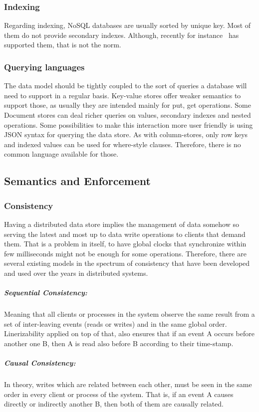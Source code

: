 	\subsubsection{Indexing}
	Regarding indexing, NoSQL databases are usually sorted by unique key. Most of them do not provide secondary indexes. Although, recently for instance~\cite{Mongodb} has supported them, that is not the norm. 
	
	\subsubsection{Querying languages}
	The data model should be tightly coupled to the sort of queries a database will need to support in a regular basis. Key-value stores offer weaker semantics to support those, as usually they are intended mainly for put, get operations. Some Document stores can deal richer queries on values, secondary indexes and nested operations. Some possibilities to make this interaction more user friendly is using JSON syntax for querying the data store. As with column-stores, only row keys and indexed values can be used for where-style clauses. Therefore, there is no common language available for those.

\subsection{Semantics and Enforcement}

	\subsubsection{Consistency}
	Having a distributed data store implies the management of data somehow so serving the latest and most up to data write operations to clients that demand them. That is a problem in itself, to have global clocks that synchronize within few milliseconds might not be enough for some operations. Therefore, there are several existing models in the spectrum of consistency that have been developed and used over the years in distributed systems.

		\subparagraph{Sequential Consistency:}
		Meaning that all clients or processes in the system observe the same result from a set of inter-leaving events (reads or writes) and in the same global order. Linerizability applied on top of that, also ensures that if an event A occurs before another one B, then A is read also before B according to their time-stamp.

		\subparagraph{Causal Consistency:}
		In theory, writes which are related between each other, must be seen in the same order in every client or process of the system. That is, if an event A causes directly or indirectly another B, then both of them are causally related.


